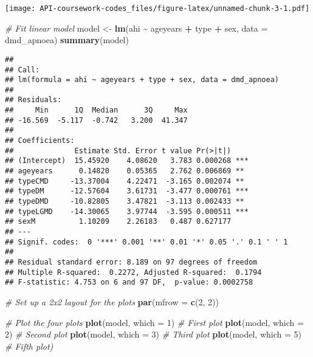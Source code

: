 \documentclass[
]{article}
\newenvironment{Shaded}{\begin{snugshade}}{\end{snugshade}}
\newcommand{\AttributeTok}[1]{\textcolor[rgb]{0.13,0.29,0.53}{#1}}
\newcommand{\CommentTok}[1]{\textcolor[rgb]{0.56,0.35,0.01}{\textit{#1}}}
\newcommand{\DecValTok}[1]{\textcolor[rgb]{0.00,0.00,0.81}{#1}}
\newcommand{\FunctionTok}[1]{\textcolor[rgb]{0.13,0.29,0.53}{\textbf{#1}}}
\newcommand{\NormalTok}[1]{#1}
\newcommand{\OtherTok}[1]{\textcolor[rgb]{0.56,0.35,0.01}{#1}}
\newcommand{\SpecialCharTok}[1]{\textcolor[rgb]{0.81,0.36,0.00}{\textbf{#1}}}
\begin{document}
\texttt{[image: API-coursework-codes\_files/figure-latex/unnamed-chunk-3-1.pdf]}

\begin{Shaded}
\begin{Highlighting}[]
\CommentTok{\# Fit linear model}
\NormalTok{model }\OtherTok{\textless{}{-}} \FunctionTok{lm}\NormalTok{(ahi }\SpecialCharTok{\textasciitilde{}}\NormalTok{ ageyears }\SpecialCharTok{+}\NormalTok{ type }\SpecialCharTok{+}\NormalTok{ sex, }\AttributeTok{data =}\NormalTok{ dmd\_apnoea)}
\FunctionTok{summary}\NormalTok{(model)}
\end{Highlighting}
\end{Shaded}

\begin{verbatim}
## 
## Call:
## lm(formula = ahi ~ ageyears + type + sex, data = dmd_apnoea)
## 
## Residuals:
##     Min      1Q  Median      3Q     Max 
## -16.569  -5.117  -0.742   3.200  41.347 
## 
## Coefficients:
##              Estimate Std. Error t value Pr(>|t|)    
## (Intercept)  15.45920    4.08620   3.783 0.000268 ***
## ageyears      0.14820    0.05365   2.762 0.006869 ** 
## typeCMD     -13.37004    4.22471  -3.165 0.002074 ** 
## typeDM      -12.57604    3.61731  -3.477 0.000761 ***
## typeDMD     -10.82805    3.47821  -3.113 0.002433 ** 
## typeLGMD    -14.30065    3.97744  -3.595 0.000511 ***
## sexM          1.10209    2.26183   0.487 0.627177    
## ---
## Signif. codes:  0 '***' 0.001 '**' 0.01 '*' 0.05 '.' 0.1 ' ' 1
## 
## Residual standard error: 8.189 on 97 degrees of freedom
## Multiple R-squared:  0.2272, Adjusted R-squared:  0.1794 
## F-statistic: 4.753 on 6 and 97 DF,  p-value: 0.0002758
\end{verbatim}

\begin{Shaded}
\begin{Highlighting}[]
\CommentTok{\# Set up a 2x2 layout for the plots}
\FunctionTok{par}\NormalTok{(}\AttributeTok{mfrow =} \FunctionTok{c}\NormalTok{(}\DecValTok{2}\NormalTok{, }\DecValTok{2}\NormalTok{))}

\CommentTok{\# Plot the four plots}
\FunctionTok{plot}\NormalTok{(model, }\AttributeTok{which =} \DecValTok{1}\NormalTok{)  }\CommentTok{\# First plot}
\FunctionTok{plot}\NormalTok{(model, }\AttributeTok{which =} \DecValTok{2}\NormalTok{)  }\CommentTok{\# Second plot}
\FunctionTok{plot}\NormalTok{(model, }\AttributeTok{which =} \DecValTok{3}\NormalTok{)  }\CommentTok{\# Third plot}
\FunctionTok{plot}\NormalTok{(model, }\AttributeTok{which =} \DecValTok{5}\NormalTok{)  }\CommentTok{\# Fifth plot)}
\end{Highlighting}
\end{Shaded}
\end{document}
